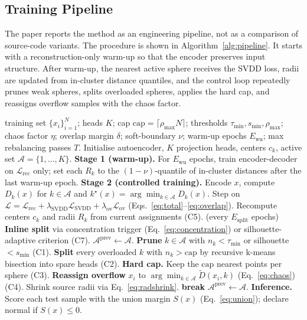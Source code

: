 \documentclass[conference]{IEEEtran}
\begin{document}
\subsection{Training Pipeline}
The paper reports the method as an engineering pipeline, not as a comparison of source-code variants. The procedure is shown in Algorithm~\ref{alg:pipeline}. It starts with a reconstruction-only warm-up so that the encoder preserves input structure. After warm-up, the nearest active sphere receives the SVDD loss, radii are updated from in-cluster distance quantiles, and the control loop repeatedly prunes weak spheres, splits overloaded spheres, applies the hard cap, and reassigns overflow samples with the chaos factor.

\begin{algorithm}[t]
\caption{Controlled multi-sphere SVDD training.}
\label{alg:pipeline}
\begin{algorithmic}[1]
\REQUIRE training set \(\{x_i\}_{i=1}^{N}\); heads \(K\); cap \(\mathrm{cap}=\lceil\rho_{\max}N\rceil\); thresholds \(\tau_{\min},s_{\min},\rho_{\max}\); chaos factor \(\eta\); overlap margin \(\delta\); soft-boundary \(\nu\); warm-up epochs \(E_{\mathrm{wu}}\); max rebalancing passes \(T\).
\STATE Initialise autoencoder, \(K\) projection heads, centers \(c_k\), active set \(\mathcal{A}=\{1,\dots,K\}\).
\STATE \textbf{Stage 1 (warm-up).} For \(E_{\mathrm{wu}}\) epochs, train encoder-decoder on \(\mathcal{L}_{\mathrm{rec}}\) only; set each \(R_k\) to the \((1-\nu)\)-quantile of in-cluster distances after the last warm-up epoch.
\STATE \textbf{Stage 2 (controlled training).}
        \STATE Encode \(x\), compute \(D_k(x)\) for \(k\in\mathcal{A}\) and \(k^{\star}(x)\!=\!\arg\min_{k\in\mathcal{A}}D_k(x)\).
        \STATE Step on \(\mathcal{L}=\mathcal{L}_{\mathrm{rec}}+\lambda_{\mathrm{SVDD}}\mathcal{L}_{\mathrm{SVDD}}+\lambda_{\mathrm{ov}}\mathcal{L}_{\mathrm{ov}}\) (Eqs.~\ref{eq:total}--\ref{eq:overlap}).
    \ENDFOR
    \STATE Recompute centers \(c_k\) and radii \(R_k\) from current assignments (C5).
    \STATE (every \(E_{\mathrm{split}}\) epochs) \textbf{Inline split} via concentration trigger (Eq.~\ref{eq:concentration}) or silhouette-adaptive criterion (C7).
    \STATE \(\mathcal{A}^{\mathrm{prev}}\leftarrow\mathcal{A}\).
        \STATE \textbf{Prune} \(k\in\mathcal{A}\) with \(n_k<\tau_{\min}\) or silhouette \(<s_{\min}\) (C1).
        \STATE \textbf{Split} every overloaded \(k\) with \(n_k>\mathrm{cap}\) by recursive k-means bisection into spare heads (C2).
        \STATE \textbf{Hard cap.} Keep the \(\mathrm{cap}\) nearest points per sphere (C3).
        \STATE \textbf{Reassign overflow} \(x_i\) to \(\arg\min_{k\in\mathcal{A}}\tilde{D}(x_i,k)\) (Eq.~\ref{eq:chaos}) (C4).
        \STATE Shrink source radii via Eq.~\ref{eq:radshrink}.
            \STATE \textbf{break}
        \ENDIF
        \STATE \(\mathcal{A}^{\mathrm{prev}}\leftarrow\mathcal{A}\).
    \ENDFOR
\ENDFOR
\STATE \textbf{Inference.} Score each test sample with the union margin \(S(x)\) (Eq.~\ref{eq:union}); declare normal if \(S(x)\le 0\).
\end{algorithmic}
\end{algorithm}
\end{document}
